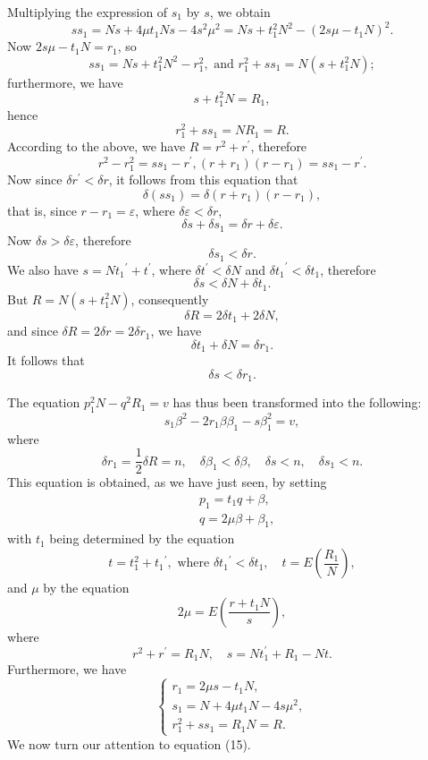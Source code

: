 \documentclass[oneside, 12 pt, leqno]{memoir}
\begin{document}
Multiplying the expression of \(s_1\) by \(s\), we obtain
\[s s_1=N s+4 \mu t_1 N s-4 s^2 \mu^2=N s+t_1^2 N^2-\left(2 s \mu-t_1 N\right)^2.\]
Now \(2 s \mu-t_1 N=r_1\), so
\[s s_1=N s+t_1^2 N^2-r_1^2, \text { and } r_1^2+s s_1=N\left(s+t_1^2 N\right);\]
furthermore, we have
\[s+t_1^2 N=R_1,\]
hence
\[\tag{16} r_1^2+s s_1 = N R_1 = R.\]
According to the above, we have \(R=r^2+r^{\prime}\), therefore
\[r^2-r_1^2=s s_1-r^{\prime},\left(r+r_1\right)\left(r-r_1\right)=s s_1-r^{\prime}.\]
Now since \(\delta r^{\prime}<\delta r\), it follows from this equation that
\[\delta\left(s s_1\right)=\delta\left(r+r_1\right)\left(r-r_1\right),\]
that is, since \(r-r_1=\varepsilon\), where \(\delta \varepsilon<\delta r\),
\[\delta s+\delta s_1=\delta r+\delta \varepsilon.\]
Now \(\delta s > \delta \varepsilon\), therefore
\[\delta s_1 < \delta r.\]
We also have \(s=N {t_1}^{\prime}+t^{\prime}\), where \(\delta t^{\prime}<\delta N\) and \({\delta t_1}^{\prime}<\delta t_1\), therefore
\[\delta s< \delta N+\delta t_1.\]
But \(R=N\left(s+t_1^2 N\right)\), consequently
\[\delta R=2 \delta t_1+2 \delta N,\]
and since \(\delta R=2 \delta r=2 \delta r_1\), we have
\[\delta t_1+\delta N=\delta r_1.\]
It follows that
\[\delta s< \delta r_1.\]

The equation \(p_1^2 N-q^2 R_1=v\) has thus been transformed into the following:
\[s_1 \beta^2-2 r_1 \beta \beta_1-s \beta_1^2=v,\]
where
\[\delta r_1=\frac{1}{2} \delta R=n, \quad \delta \beta_1<\delta \beta, \quad \delta s<n, \quad \delta s_1<n.\]
This equation is obtained, as we have just seen, by setting
\[\tag{17}\begin{aligned}
& p_1=t_1 q+\beta, \\
& q=2 \mu \beta+\beta_1,
\end{aligned}\]
with \(t_1\) being determined by the equation
\[t=t_1^2+{t_1}^{\prime}, \text { where } \delta {t_1}^{\prime}<\delta t_1, \quad t=E\left(\frac{R_1}{N}\right),\]
and \(\mu\) by the equation
\[2 \mu=E\left(\frac{r+t_1 N}{s}\right),\]
where
\[r^2+r^{\prime}=R_1 N, \quad s=N t_1^{\prime}+R_1-N t.\]
Furthermore, we have
\[\tag{18}\left\{\begin{array}{l}
r_1=2 \mu s-t_1 N, \\
s_1=N+4 \mu t_1 N-4 s \mu^2, \\
r_1^2+s s_1=R_1 N=R.
\end{array}\right.\]
We now turn our attention to equation (15).
%
\end{document}
